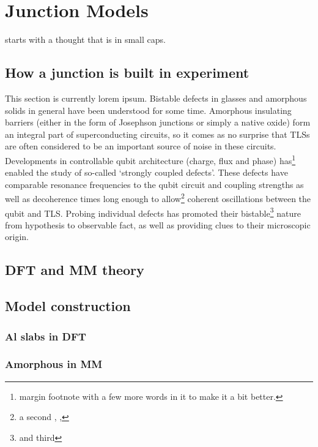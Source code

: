 \chapter{Junction Models}

 starts with a thought that is in small caps.

\section{How a junction is built in experiment}

This section is currently lorem ipsum.
Bistable defects in glasses and amorphous solids in general have been understood for some time.
Amorphous insulating barriers (either in the form of Josephson junctions or simply a native oxide) form an integral part of superconducting circuits, so it comes as no surprise that TLSs are often considered to be an important source of noise in these circuits.
Developments in controllable qubit architecture (charge, flux and phase) has\footnote{margin footnote with a few more words in it to make it a bit better.} enabled the study of so-called ‘strongly coupled defects’.
These defects have comparable resonance frequencies to the qubit circuit and coupling strengths as well as decoherence times long enough to allow\footnote{a second \the\marginparwidth, \the\marginparsep, \the\marginparpush} coherent oscillations between the qubit and TLS.
Probing individual defects has promoted their bistable\footnote{and third} nature from hypothesis to observable fact, as well as providing clues to their microscopic origin.

\section{DFT and MM theory}
\section{Model construction}
\subsection{Al slabs in DFT}
\subsection{Amorphous \texorpdfstring{}{AlOₓ} in MM}
